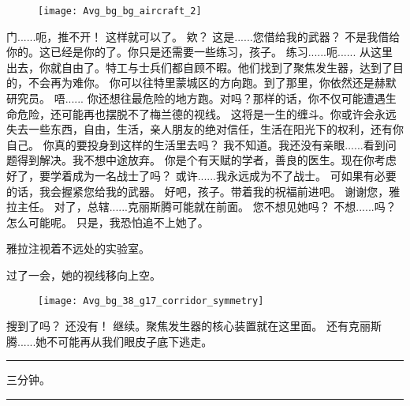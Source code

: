 \documentclass[openany]{book}
\begin{document}
\begin{figure}[h]
    \centering
    \texttt{[image: Avg\_bg\_bg\_aircraft\_2]}
\end{figure}
\begin{dialogue}
     门......呃，推不开！
     这样就可以了。
     欸？
     这是......您借给我的武器？
     不是我借给你的。这已经是你的了。你只是还需要一些练习，孩子。
     练习......呃......
     从这里出去，你就自由了。特工与士兵们都自顾不暇。他们找到了聚焦发生器，达到了目的，不会再为难你。
     你可以往特里蒙城区的方向跑。到了那里，你依然还是赫默研究员。
     唔......
     你还想往最危险的地方跑。对吗？那样的话，你不仅可能遭遇生命危险，还可能再也摆脱不了梅兰德的视线。
     这将是一生的缠斗。你或许会永远失去一些东西，自由，生活，亲人朋友的绝对信任，生活在阳光下的权利，还有你自己。
     你真的要投身到这样的生活里去吗？
     我不知道。我还没有亲眼......看到问题得到解决。我不想中途放弃。
     你是个有天赋的学者，善良的医生。现在你考虑好了，要学着成为一名战士了吗？
     或许......我永远成为不了战士。
     可如果有必要的话，我会握紧您给我的武器。
     好吧，孩子。带着我的祝福前进吧。
     谢谢您，雅拉主任。
     对了，总辖......克丽斯腾可能就在前面。
     您不想见她吗？
     不想......吗？怎么可能呢。
     只是，我恐怕追不上她了。
\end{dialogue}
\par
雅拉注视着不远处的实验室。\par
过了一会，她的视线移向上空。

\begin{figure}[h]
    \centering
    \texttt{[image: Avg\_bg\_38\_g17\_corridor\_symmetry]}
\end{figure}
\begin{dialogue}
     搜到了吗？
     还没有！
     继续。聚焦发生器的核心装置就在这里面。
     还有克丽斯腾......她不可能再从我们眼皮子底下逃走。
\end{dialogue}

\par\noindent\rule{\textwidth}{0.4pt}
三分钟。
\par\noindent\rule{\textwidth}{0.4pt}
\end{document}
